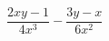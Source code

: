\begin{ex}
	\begin{condition}
		\( \dfrac{2xy-1}{4x^3}-\dfrac{3y-x}{6x^2} \)
	\end{condition}
\end{ex}